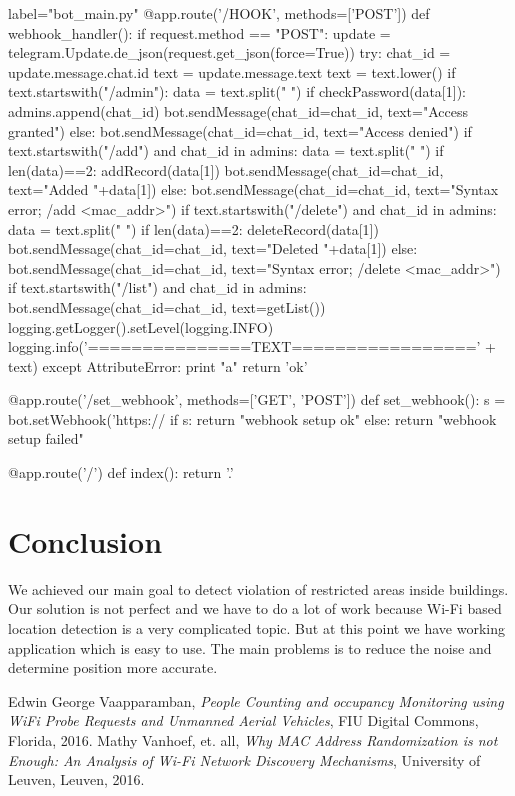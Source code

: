 \documentclass[a4paper,11pt]{article}
\begin{document}
\begin{pythoncode*}{label="bot\_main.py"}
@app.route('/HOOK', methods=['POST']) 
def webhook_handler(): 
    if request.method == "POST": 
        update = telegram.Update.de_json(request.get_json(force=True))
        try:
            chat_id = update.message.chat.id 
            text = update.message.text
            text = text.lower()
            if text.startswith("/admin"):
                data = text.split(" ")
                if checkPassword(data[1]):
                    admins.append(chat_id)
                    bot.sendMessage(chat_id=chat_id, text="Access granted")
                else:
                    bot.sendMessage(chat_id=chat_id, text="Access denied")
            if text.startswith("/add") and chat_id in admins:
                data = text.split(" ")
                if len(data)==2:
                    addRecord(data[1])
                    bot.sendMessage(chat_id=chat_id, text="Added "+data[1])
                else:
                    bot.sendMessage(chat_id=chat_id, text="Syntax error; /add <mac_addr>")
            if text.startswith("/delete") and chat_id in admins:
                data = text.split(" ")
                if len(data)==2:
                    deleteRecord(data[1])
                    bot.sendMessage(chat_id=chat_id, text="Deleted "+data[1])
                else:
                    bot.sendMessage(chat_id=chat_id, text="Syntax error; /delete <mac_addr>")
            if text.startswith("/list") and chat_id in admins:
                bot.sendMessage(chat_id=chat_id, text=getList())
            logging.getLogger().setLevel(logging.INFO) 
            logging.info('===============TEXT=================' + text) 
        except AttributeError:
            print "a"
    return 'ok' 

 
@app.route('/set_webhook', methods=['GET', 'POST']) 
def set_webhook(): 
    s = bot.setWebhook('https://%
    if s: 
        return "webhook setup ok" 
    else: 
        return "webhook setup failed" 

@app.route('/') 
def index(): 
    return '.' 
\end{pythoncode*}

\section{Conclusion}
We achieved our main goal to detect violation of restricted areas inside buildings. Our solution is not perfect and we have to do a lot of work because Wi-Fi based location detection is a very complicated topic. But at this point we have working application which is easy to use. The main problems is to reduce the noise and determine position more accurate.


\begin{thebibliography}{9}

  Edwin George Vaapparamban,
  \emph{People Counting and occupancy Monitoring using WiFi Probe Requests and Unmanned Aerial Vehicles},
  FIU Digital Commons, Florida,
  2016.
  Mathy Vanhoef, et. all,
  \emph{Why MAC Address Randomization is not Enough: An Analysis of Wi-Fi Network Discovery Mechanisms},
  University of Leuven, Leuven,
  2016.

\end{thebibliography}
\end{document}
